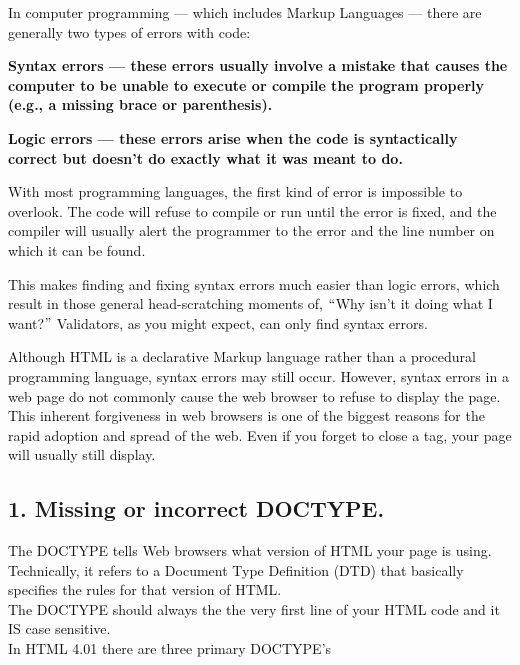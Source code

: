 \documentclass[12pt]{report}
\renewcommand{\_}{\kern-1.5pt\textunderscore\kern-1.5pt}
\begin{document}
\begin{itemize}
\vspace{\baselineskip}
\textcolor[HTML]{0D0D0D}{In computer programming — which includes Markup Languages — there are generally two types of errors with code:}\par


\vspace{\baselineskip}
\textbf{\textcolor[HTML]{0D0D0D}{Syntax errors — these errors usually involve a mistake that causes the computer to be unable to execute or compile the program properly (e.g., a missing brace or parenthesis).}}\par


\vspace{\baselineskip}
\textbf{\textcolor[HTML]{0D0D0D}{Logic errors — these errors arise when the code is syntactically correct but doesn’t do exactly what it was meant to do.}}\par


\vspace{\baselineskip}
\textcolor[HTML]{0D0D0D}{With most programming languages, the first kind of error is impossible to overlook. The code will refuse to compile or run until the error is fixed, and the compiler will usually alert the programmer to the error and the line number on which it can be found.}\par


\vspace{\baselineskip}
\textcolor[HTML]{0D0D0D}{This makes finding and fixing syntax errors much easier than logic errors, which result in those general head-scratching moments of, $``$Why isn’t it doing what I want?$"$  Validators, as you might expect, can only find syntax errors.}\par


\vspace{\baselineskip}
\textcolor[HTML]{0D0D0D}{Although HTML is a declarative Markup language rather than a procedural programming language, syntax errors may still occur. However, syntax errors in a web page do not commonly cause the web browser to refuse to display the page. This inherent forgiveness in web browsers is one of the biggest reasons for the rapid adoption and spread of the web. Even if you forget to close a tag, your page will usually still display.}\par


\vspace{\baselineskip}
\setlength{\parskip}{9.0pt}

\end{itemize}\subsection*{1. Missing or incorrect DOCTYPE.}
\textcolor[HTML]{0D0D0D}{The DOCTYPE tells Web browsers what version of HTML your page is using. Technically, it refers to a Document Type Definition (DTD) that basically specifies the rules for that version of HTML.\\
The DOCTYPE should always the the very first line of your HTML code and it IS case sensitive.\\
In HTML 4.01 there are three primary DOCTYPE's}\par
\end{document}
